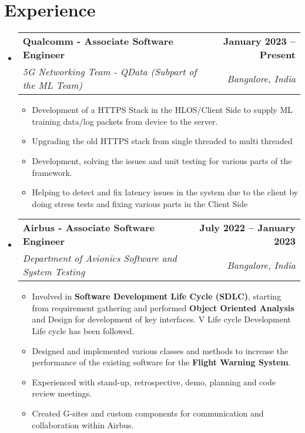 \documentclass[letterpaper,11pt]{article}
\makeatletter
\newcommand{\resumeItem}[1]{
  \item\small{
    {#1 \vspace{-2pt}}
  }
}
\newcommand{\resumeSubheading}[4]{
  \vspace{-2pt}\item
    \begin{tabular*}{1.0\textwidth}[t]{l@{\extracolsep{\fill}}r}
      \textbf{#1} & \textbf{\small #2} \\
      \textit{\small#3} & \textit{\small #4} \\
    \end{tabular*}\vspace{-7pt}
}
\newcommand{\resumeSubHeadingListStart}{\begin{itemize}[leftmargin=0.0in, label={}]}
\newcommand{\resumeSubHeadingListEnd}{\end{itemize}}
\newcommand{\resumeItemListStart}{\begin{itemize}}
\newcommand{\resumeItemListEnd}{\end{itemize}\vspace{-5pt}}
\makeatother
\begin{document}
\section{Experience}
  \resumeSubHeadingListStart
    \resumeSubheading
      {Qualcomm - Associate Software Engineer }{January 2023 -- Present}
      {5G Networking Team - QData (Subpart of the ML Team) }{Bangalore, India}
      \resumeItemListStart
      \resumeItem{Development of a HTTPS Stack in the HLOS/Client Side to supply ML training data/log packets from \newline device to the server.}
      \resumeItem{Upgrading the old HTTPS stack from single threaded to multi threaded}
      \resumeItem{Development, solving the issues and unit testing for various parts of the framework.}
      \resumeItem{Helping to detect and fix latency issues in the system due to the client by doing stress tests and fixing \newline various parts in the Client Side}
      \resumeItemListEnd
     \resumeSubheading
      {Airbus - Associate Software Engineer }{July 2022 -- January 2023}
      {Department of Avionics Software and System Testing}{Bangalore, India}
      \resumeItemListStart
        \resumeItem{Involved in \textbf{Software Development Life Cycle (SDLC)}, starting from requirement gathering and performed \newline \textbf{Object Oriented Analysis} and Design for development of key interfaces. V Life cycle Development Life cycle \newline has been followed.}
        \resumeItem{Designed and implemented various classes and methods to increase the performance of the existing software for the \textbf{Flight Warning System}.}
        \resumeItem{Experienced with stand-up, retrospective, demo, planning and code review meetings.}
        \resumeItem{Created G-sites and custom components for communication and collaboration within Airbus.}
    \resumeItemListEnd
  \resumeSubHeadingListEnd
\vspace{-16pt}

\smallskip
\end{document}

